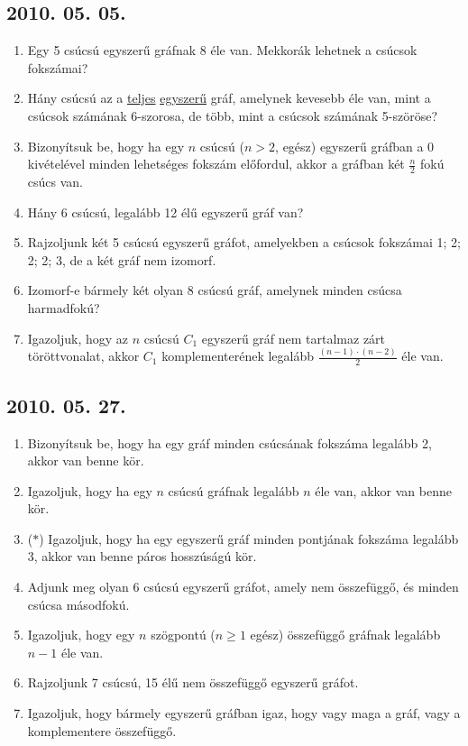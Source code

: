 \subsection*{2010. 05. 05.}
\begin{enumerate}
\item Egy 5 csúcsú egyszerű gráfnak 8 éle van. Mekkorák lehetnek a csúcsok fokszámai?
\item Hány csúcsú az a \underline{teljes} \underline{egyszerű} gráf, amelynek kevesebb éle van, mint a csúcsok számának 6-szorosa, de több, mint a csúcsok számának 5-szöröse?
\item Bizonyítsuk be, hogy ha egy $n$ csúcsú ($n>2$, egész) egyszerű gráfban a 0 kivételével minden lehetséges fokszám előfordul, akkor a gráfban két $\frac{n}{2}$ fokú csúcs van.
\item Hány 6 csúcsú, legalább 12 élű egyszerű gráf van?
\item Rajzoljunk két 5 csúcsú egyszerű gráfot, amelyekben a csúcsok fokszámai 1; 2; 2; 2; 3, de a két gráf nem izomorf.
\item Izomorf-e bármely két olyan 8 csúcsú gráf, amelynek minden csúcsa harmadfokú?
\item Igazoljuk, hogy az $n$ csúcsú $C_1$ egyszerű gráf nem tartalmaz zárt töröttvonalat, akkor $C_1$ komplementerének legalább $\frac{(n-1)\cdot(n-2)}{2}$ éle van.
\end{enumerate}


\subsection*{2010. 05. 27.}
\begin{enumerate}
\item Bizonyítsuk be, hogy ha egy gráf minden csúcsának fokszáma legalább 2, akkor van benne kör.
\item Igazoljuk, hogy ha egy $n$ csúcsú gráfnak legalább $n$ éle van, akkor van benne kör.
\item ($*$) Igazoljuk, hogy ha egy egyszerű gráf minden pontjának fokszáma legalább 3, akkor van benne páros hosszúságú kör.
\item Adjunk meg olyan 6 csúcsú egyszerű gráfot, amely nem összefüggő, és minden csúcsa másodfokú.
\item Igazoljuk, hogy egy $n$ szögpontú ($n\geq 1$ egész) összefüggő gráfnak legalább $n-1$ éle van.
\item Rajzoljunk 7 csúcsú, 15 élű nem összefüggő egyszerű gráfot.
\item Igazoljuk, hogy bármely egyszerű gráfban igaz, hogy vagy maga a gráf, vagy a komplementere összefüggő.
\end{enumerate}


